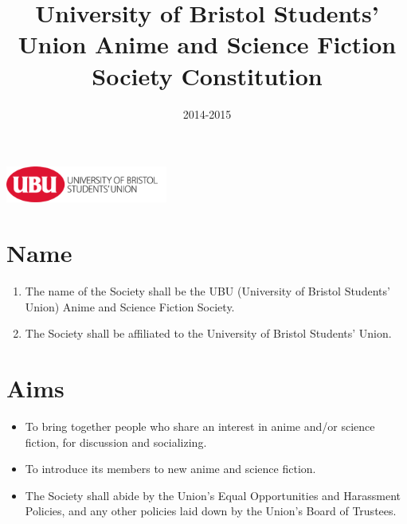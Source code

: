 \documentclass[a4paper,10pt]{article}
\title{University of Bristol Students' Union Anime and Science Fiction Society Constitution}
\author{}
\date{2014-2015}
\begin{document}
\begin{titlepage}
\clearpage\maketitle
\thispagestyle{empty}
\vfill
\includegraphics[height=1.2cm,keepaspectratio=true]{./images/ubu-logo.png}
\end{titlepage}

\section{Name}
\begin{enumerate}
  \item The name of the Society shall be the UBU (University of Bristol Students' Union) Anime and Science Fiction Society.
  \item The Society shall be affiliated to the University of Bristol Students' Union.
\end{enumerate}

\section{Aims}
\begin{itemize}
  \item To bring together people who share an interest in anime and/or science fiction, for discussion and socializing.
  \item To introduce its members to new anime and science fiction.
  \item The Society shall abide by the Union's Equal Opportunities and Harassment Policies, and any other policies laid down by the Union's Board of Trustees.
\end{itemize}
\end{document}
